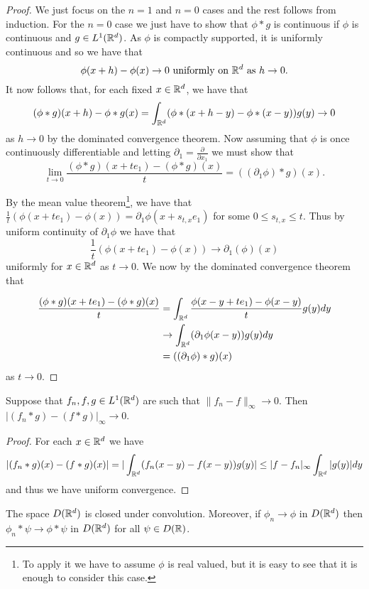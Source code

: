 \documentclass[twoside, a4paper, 10pt]{amsart}
\begin{document}
\begin{proof} We just focus on the $n=1$ and $n=0$ cases and the rest follows from induction. For the $n=0$ case we just have to show that $\phi * g$ is continuous if $\phi$ is continuous and $g \in L^1(\mathbb{R}^d)$. As $\phi$ is compactly supported, it is uniformly continuous and so we have that $$\phi(x+h) - \phi(x) \to 0 \text{ uniformly on } \mathbb{R}^d \text{ as } h \to 0.$$ It now follows that, for each fixed $x \in \mathbb{R}^d$, we have that $$(\phi * g)(x+h) - \phi*g(x) = \int_{\mathbb{R}^d} (\phi*(x+h-y) - \phi*(x-y)) g(y) \to 0$$ as $h \to 0$ by the dominated convergence theorem. Now assuming that $\phi$ is once continuously differentiable and letting $\partial_1 = \frac{\partial}{\partial x_1}$ we must show that $$
\lim_{t \to 0} \frac{(\phi * g)(x+ te_1) - (\phi *g)(x)}{t} = ((\partial_1 \phi) * g)(x).$$

By the mean value theorem\footnote{To apply it we have to assume $\phi$ is real valued, but it is easy to see that it is enough to consider this case.}, we have that $\frac{1}{t}(\phi(x+ te_1) - \phi(x) )= \partial_1 \phi (x + s_{t,x}e_1)$ for some $0 \leq s_{t,x} \leq t$. Thus by uniform continuity of $\partial_1 \phi$ we have that $$\frac{1}{t} (\phi(x+ te_1) - \phi(x)) \to \partial_1(\phi)(x) $$ uniformly for $x \in \mathbb{R}^d$ as $t \to 0$. We now by the dominated convergence theorem that

\begin{align*} \frac{(\phi * g)(x+ te_1) - (\phi *g)(x)}{t} &= \int_{\mathbb{R}^d} \frac{\phi(x-y+ te_1) - \phi(x-y)}{t} g(y) dy \\ &\to \int_{\mathbb{R}^d} (\partial_1\phi(x-y)) g(y) dy \\ &= ((\partial_1 \phi) * g)(x) \end{align*} as $t \to 0$. \end{proof}

\begin{prop} Suppose that $f_n,f,g \in L^1(\mathbb{R}^d)$ are such that $\| f_n -f\|_{\infty} \to 0$. Then $|(f_n *g) - (f*g)|_{\infty} \to 0$.

\end{prop}

\begin{proof}

For each $x \in \mathbb{R}^d$ we have $$|(f_n * g) (x) - (f*g)(x)| = |\int_{\mathbb{R}^d} (f_n(x-y) - f(x-y)) g(y)| \leq |f - f_n|_{\infty} \int_{\mathbb{R}^d} |g(y)| dy$$ and thus we have uniform convergence. \end{proof}

\begin{corol} The space $D(\mathbb{R}^d)$ is closed under convolution. Moreover, if $\phi_n \to \phi$ in $D(\mathbb{R}^d)$ then $\phi_n * \psi \to \phi * \psi$ in $D(\mathbb{R}^d)$ for all $\psi \in D(\mathbb{R})$.

\end{corol}
\end{document}
